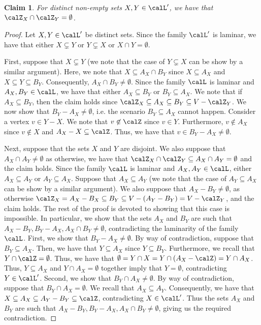 \documentclass{article}
\newtheorem{claim}{Claim}[section]
\begin{document}
\begin{claim}\label{claim:Laminar-family-projection:Z_X-Z_Y-disjoint}
    For distinct non-empty sets $X, Y \in \calL'$, we have that $\calZ_{X}\cap\calZ_{Y} = \emptyset$.
\end{claim}
\begin{proof}
     Let $X, Y \in\calL'$ be distinct sets. Since the family $\calL'$ is laminar, we have that either $X \subsetneq Y$ or $Y\subsetneq X$ or $X\cap Y = \emptyset$.

    First, suppose that $X \subsetneq Y$ (we note that the case of $Y\subsetneq X$ can be show by a similar argument). Here, we note that $X \subseteq A_X \cap B_Y $ since $X \subseteq A_X$ and $X \subseteq Y \subseteq B_Y$. Consequently, $A_X\cap B_Y\neq \emptyset$. 
    Since the family $\calL$ is laminar and $A_X, B_Y \in \calL$, we have that either $A_X \subseteq B_Y$ or $B_Y \subseteq A_X$. We note that if $A_X \subseteq B_Y$, then the claim holds since $\calZ_X \subseteq A_X \subseteq B_{Y} \subseteq V - \calZ_Y$.
    We now show that $B_Y - A_X \not = \emptyset$, i.e. the scenario $B_Y \subseteq A_X$ cannot happen. 
    Consider a vertex $v \in Y - X$. We note that 
    $v \not \in \calZ$
    since $v \in Y$. Furthermore, $v \not \in A_X$ since $v \not \in X$ and $A_X - X \subseteq \calZ$.
    Thus, we have that $v \in B_Y - A_X \not = \emptyset$.

    Next, suppose that the sets $X$ and $Y$ are disjoint. We also suppose that $A_X \cap A_Y \not = \emptyset$ as otherwise, we have that $\calZ_X \cap \calZ_Y \subseteq A_X \cap A_Y = \emptyset$ and the claim holds. Since the family $\calL$ is laminar and $A_X, A_Y \in \calL$, either $A_X \subseteq A_Y$ or $A_Y \subseteq A_X$. Suppose that  $A_X \subseteq A_Y$ (we note that the case of $A_Y \subseteq A_X$ can be show by a similar argument).
    We also suppose that $A_X - B_Y \not = \emptyset$, as otherwise $\calZ_X = A_X - B_X \subseteq B_Y \subseteq V - (A_Y - B_Y) = V - \calZ_Y$, and the claim holds. 
    The rest of the proof is devoted to showing that this case is impossible. In particular, we show that
    the sets $A_X$ and $B_Y$ are such that $A_X-B_Y, B_Y-A_X, A_X\cap B_Y\neq \emptyset$, contradicting the laminarity of the family $\calL$. First, we show that $B_Y - A_X \not = \emptyset$. By way of contradiction, suppose that $B_Y \subseteq A_X$. Then, we have that $Y \subseteq A_X$ since $Y \subseteq B_Y$. Furthermore,  we recall that $Y\cap \calZ = \emptyset$. Thus, we have that $\emptyset = Y \cap X = Y \cap (A_X - \calZ) = Y\cap A_X$. Thus, $Y\subseteq A_X$ and $Y\cap A_X=\emptyset$ together imply that $Y = \emptyset$, contradicting $Y \in \calL'$. Second, we show that $B_Y\cap A_X \not = \emptyset$. By way of contradiction, suppose that $B_Y\cap A_X = \emptyset$. We recall that $A_X\subseteq A_Y$. Consequently, we have that $X \subseteq A_X \subseteq A_Y - B_Y \subseteq \calZ$, contradicting $X \in \calL'$. Thus the sets $A_X$ and $B_Y$ are such that $A_X-B_Y, B_Y-A_X, A_X\cap B_Y\neq \emptyset$, giving us the required contradiction.
\end{proof}
\end{document}
